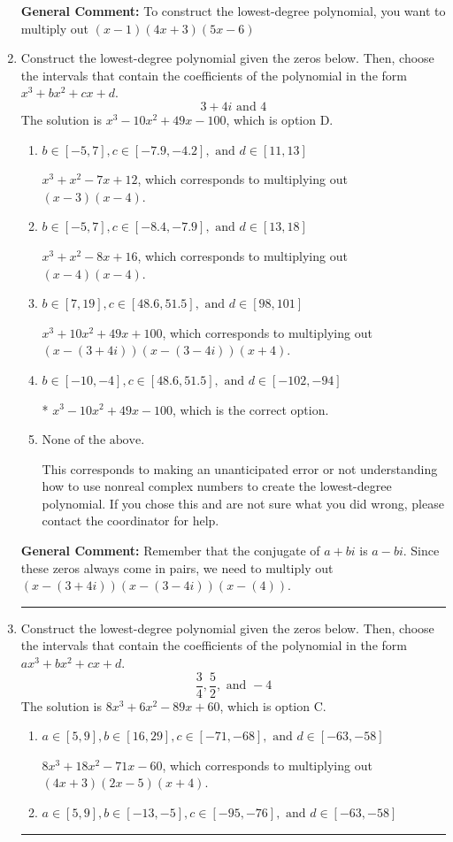 \documentclass{extbook}[14pt]
\newcommand{\litem}[1]{\item #1

\rule{\textwidth}{0.4pt}}
\begin{document}
\begin{enumerate}
{\textbf{General Comment:} To construct the lowest-degree polynomial, you want to multiply out $(x -1)(4x + 3)(5x -6)$
}
\litem{
Construct the lowest-degree polynomial given the zeros below. Then, choose the intervals that contain the coefficients of the polynomial in the form $x^3+bx^2+cx+d$.
\[ 3 + 4 i \text{ and } 4 \]The solution is \( x^{3} -10 x^{2} +49 x -100 \), which is option D.\begin{enumerate}[label=\Alph*.]
\item \( b \in [-5, 7], c \in [-7.9, -4.2], \text{ and } d \in [11, 13] \)

$x^{3} + x^{2} -7 x + 12$, which corresponds to multiplying out $(x -3)(x -4)$.
\item \( b \in [-5, 7], c \in [-8.4, -7.9], \text{ and } d \in [13, 18] \)

$x^{3} + x^{2} -8 x + 16$, which corresponds to multiplying out $(x -4)(x -4)$.
\item \( b \in [7, 19], c \in [48.6, 51.5], \text{ and } d \in [98, 101] \)

$x^{3} +10 x^{2} +49 x + 100$, which corresponds to multiplying out $(x-(3 + 4 i))(x-(3 - 4 i))(x + 4)$.
\item \( b \in [-10, -4], c \in [48.6, 51.5], \text{ and } d \in [-102, -94] \)

* $x^{3} -10 x^{2} +49 x -100$, which is the correct option.
\item \( \text{None of the above.} \)

This corresponds to making an unanticipated error or not understanding how to use nonreal complex numbers to create the lowest-degree polynomial. If you chose this and are not sure what you did wrong, please contact the coordinator for help.
\end{enumerate}

\textbf{General Comment:} Remember that the conjugate of $a+bi$ is $a-bi$. Since these zeros always come in pairs, we need to multiply out $(x-(3 + 4 i))(x-(3 - 4 i))(x-(4))$.
}
\litem{
Construct the lowest-degree polynomial given the zeros below. Then, choose the intervals that contain the coefficients of the polynomial in the form $ax^3+bx^2+cx+d$.
\[ \frac{3}{4}, \frac{5}{2}, \text{ and } -4 \]The solution is \( 8x^{3} +6 x^{2} -89 x + 60 \), which is option C.\begin{enumerate}[label=\Alph*.]
\item \( a \in [5, 9], b \in [16, 29], c \in [-71, -68], \text{ and } d \in [-63, -58] \)

$8x^{3} +18 x^{2} -71 x -60$, which corresponds to multiplying out $(4x + 3)(2x -5)(x + 4)$.
\item \( a \in [5, 9], b \in [-13, -5], c \in [-95, -76], \text{ and } d \in [-63, -58] \)


\end{enumerate}}
\end{enumerate}
\end{document}
